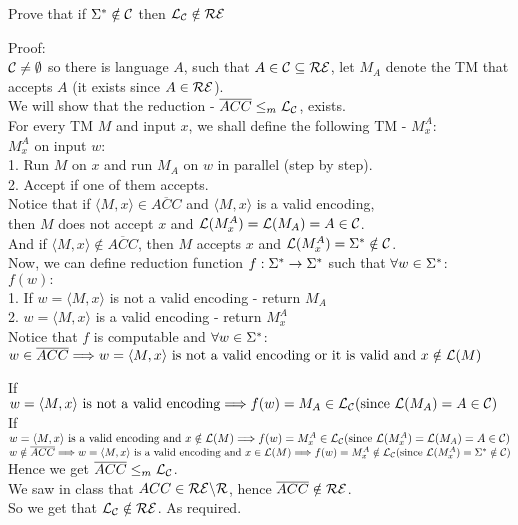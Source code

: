 Prove that if $\Sigma^* \notin \mathcal{C}$ then $\mathcal{L}_{\mathcal{C}} \notin \mathcal{R}\mathcal{E}$

Proof: \\
$\mathcal{C} \neq \emptyset$ so there is language $A$, such that $A \in \mathcal{C} \subseteq \mathcal{R}\mathcal{E}$,
let $M_A$ denote the TM that accepts $A$ (it exists since $A \in \mathcal{R}\mathcal{E}$). \\
We will show that the reduction - $\overline{ACC} \leq_m \mathcal{L}_{\mathcal{C}}$, exists. \\

For every TM $M$ and input $x$, we shall define the following TM - $M_x^A$: \\
$M_x^A$ on input $w$: \\
1. Run $M$ on $x$ and run $M_A$ on $w$ in parallel (step by step). \\
2. Accept if one of them accepts. \\

Notice that if $\langle M, x \rangle \in \overline{ACC}$ and $\langle M, x \rangle$ is a valid encoding, \\
then $M$ does not accept $x$ and $\mathcal{L}(M_x^A) = \mathcal{L}(M_A) = A \in \mathcal{C}$. \\
And if $\langle M, x \rangle \notin \overline{ACC}$,
then $M$ accepts $x$ and $\mathcal{L}(M_x^A) = \Sigma^* \notin \mathcal{C}$. \\

Now, we can define reduction function $f: \Sigma^* \rightarrow \Sigma^*$ such that $\forall w \in \Sigma^*$:\\
$f(w):$ \\
1. If $w = \langle M, x \rangle$ is not a valid encoding - return $M_A$ \\
2. $w = \langle M, x \rangle$ is a valid encoding - return $M_x^A$ \\

Notice that $f$ is computable and $\forall w \in \Sigma^*$: \\
$w \in \overline{ACC} \\
    \Longrightarrow w = \langle M, x \rangle \text{ is not a valid encoding or it is valid and } x \notin \mathcal{L}(M)$

If $w = \langle M, x \rangle \text{ is not a valid encoding}
    \Longrightarrow f(w) = M_A \in \mathcal{L}_{\mathcal{C}} (\text{since } \mathcal{L}(M_A) = A \in \mathcal{C})$ \\
If $w = \langle M, x \rangle \text{ is a valid encoding and } x \notin \mathcal{L}(M)
    \Longrightarrow f(w) = M_x^A \in \mathcal{L}_{\mathcal{C}} (\text{since } \mathcal{L}(M_x^A) = \mathcal{L}(M_A) = A \in \mathcal{C})$ \\

$w \notin \overline{ACC} \\
    \Longrightarrow w = \langle M, x \rangle \text{ is a valid encoding and } x \in \mathcal{L}(M) \\
    \Longrightarrow f(w) = M_x^A \notin \mathcal{L}_{\mathcal{C}} (\text{since } \mathcal{L}(M_x^A) = \Sigma^* \notin \mathcal{C})$ \\

Hence we get $\overline{ACC} \leq_m \mathcal{L}_{\mathcal{C}}$. \\
We saw in class that $ACC \in \mathcal{R}\mathcal{E} \backslash \mathcal{R}$, hence $\overline{ACC} \notin \mathcal{R}\mathcal{E}$. \\
So we get that $\mathcal{L}_{\mathcal{C}} \notin \mathcal{R}\mathcal{E}$. As required. \\